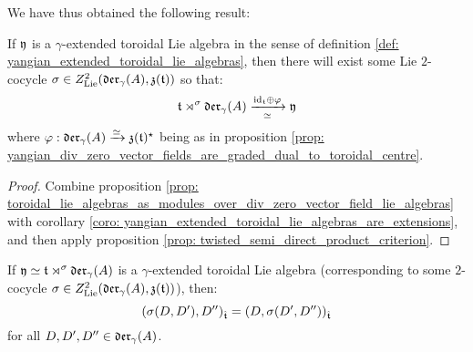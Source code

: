         We have thus obtained the following result:
        \begin{proposition} \label{prop: yangian_extended_toroidal_lie_algebras}
            If $\mathfrak{y}$ is a $\gamma$-extended toroidal Lie algebra in the sense of definition \ref{def: yangian_extended_toroidal_lie_algebras}, then there will exist some Lie $2$-cocycle $\sigma \in Z^2_{\mathrm{Lie}}(\mathfrak{der}_{\gamma}(A), \mathfrak{z}(\mathfrak{t}))$ so that:
                $$\mathfrak{t} \rtimes^{\sigma} \mathfrak{der}_{\gamma}(A) \xrightarrow[\simeq]{\mathrm{id}_{\mathfrak{t}} \oplus \varphi} \mathfrak{y}$$
            where $\varphi: \mathfrak{der}_{\gamma}(A) \xrightarrow[]{\simeq} \mathfrak{z}(\mathfrak{t})^{\star}$ being as in proposition \ref{prop: yangian_div_zero_vector_fields_are_graded_dual_to_toroidal_centre}.
        \end{proposition}
            \begin{proof}
                Combine proposition \ref{prop: toroidal_lie_algebras_as_modules_over_div_zero_vector_field_lie_algebras} with corollary \ref{coro: yangian_extended_toroidal_lie_algebras_are_extensions}, and then apply proposition \ref{prop: twisted_semi_direct_product_criterion}.
            \end{proof}
        \begin{corollary} \label{coro: yangian_cocycle_invariance}
            If $\mathfrak{y} \simeq \mathfrak{t} \rtimes^{\sigma} \mathfrak{der}_{\gamma}(A)$ is a $\gamma$-extended toroidal Lie algebra (corresponding to some $2$-cocycle $\sigma \in Z^2_{\mathrm{Lie}}(\mathfrak{der}_{\gamma}(A), \mathfrak{z}(\mathfrak{t}))$), then:
                $$(\sigma(D, D'), D'')_{\hat{\mathfrak{t}}} = (D, \sigma(D', D''))_{\hat{\mathfrak{t}}}$$
            for all $D, D', D'' \in \mathfrak{der}_{\gamma}(A)$.
        \end{corollary}
